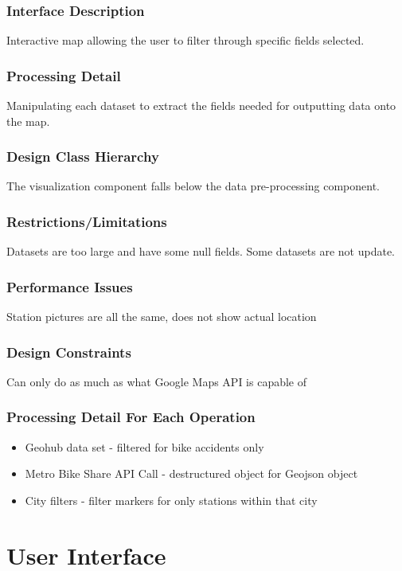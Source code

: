 \documentclass[a4paper,12pt]{article}
\begin{document}
    \subsubsection{Interface Description}
    Interactive map allowing the user to filter through specific fields selected.
    \subsubsection{Processing Detail}
    Manipulating each dataset to extract the fields needed for outputting data onto the map.
    \subsubsection{Design Class Hierarchy}
    The visualization component falls below the data pre-processing component.
    \subsubsection{Restrictions/Limitations}
     Datasets are too large and have some null fields. Some datasets are not update.
    \subsubsection{Performance Issues}
    Station pictures are all the same, does not show actual location
    \subsubsection{Design Constraints}
    Can only do as much as what Google Maps API is capable of
    \subsubsection{Processing Detail For Each Operation}
    \begin{itemize}
        \item Geohub data set - filtered for bike accidents only
        \item Metro Bike Share API Call - destructured object for Geojson object
        \item City filters - filter markers for only stations within that city
    \end{itemize}
\section{User Interface}
\end{document}
